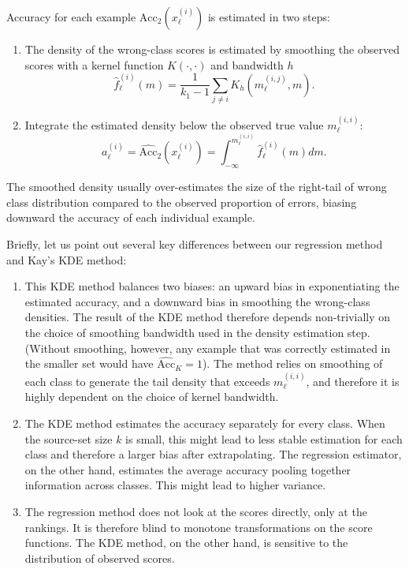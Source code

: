 \documentclass[twoside,11pt]{article}
\begin{document}
Accuracy for each example $\mathrm{Acc}_2(x_\ell^{(i)})$ is estimated in two steps:
\begin{enumerate}
\item The density of the wrong-class scores is estimated by smoothing the observed scores with a kernel function $K(\cdot,\cdot)$ and bandwidth $h$
\[\hat{f}_\ell^{(i)}(m) = \frac{1}{k_1-1} \sum_{j\neq i} K_h(m_\ell^{(i,j)}, m).\]
\item Integrate the estimated density below the observed true value $m_\ell^{(i,i)}$:
\[a_\ell^{(i)} = \widehat{\mathrm{Acc}}_2(x_\ell^{(i)}) = \int_{-\infty}^{m_\ell^{(i,i)}} \hat{f}_\ell^{(i)}(m)dm.\]
\end{enumerate}
The smoothed density usually over-estimates the size of the right-tail of wrong class distribution compared
to the observed proportion of errors, biasing downward the accuracy of each individual example. 

Briefly, let us point out several key differences between our regression method and Kay's KDE method: 
\begin{enumerate}
\item This KDE method balances two biases: an upward bias in exponentiating the estimated accuracy, and a downward bias 
in smoothing the wrong-class densities. The result of the KDE method therefore depends non-trivially on the choice of smoothing bandwidth used in the density estimation step. 
(Without smoothing, however, any example that was correctly estimated in the smaller set would have $\widehat{\mathrm{Acc}}_K = 1$). The method relies on smoothing of each class to generate the tail density that exceeds $m_\ell^{(i,i)}$, and therefore it is highly dependent on the choice of kernel bandwidth. 

\item The KDE method estimates the accuracy separately for every class. When the source-set size $k$ is small, this might lead to less stable estimation for each class 
and therefore a larger bias after extrapolating. The regression estimator, on the other hand, estimates the average accuracy pooling together information across classes. This might lead to higher variance. 

\item The regression method does not look at the scores directly, only at the rankings. It is therefore blind to monotone transformations 
on the score functions. The KDE method, on the other hand, is sensitive to the distribution of observed scores. 
\end{enumerate}
\end{document}
